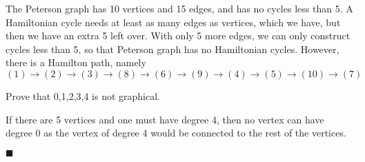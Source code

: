 \documentclass[12pt]{article}
\renewcommand{\qed}{\hfill$\blacksquare$}
\renewenvironment{proof}{\vspace{1em}\begin{addmargin}[2em]{0em}\begin{newproof}}{\end{newproof}\end{addmargin}\qed}
\newenvironment{exercise}[2][Exercise]{\begin{trivlist}
\item[\hskip \labelsep {\bfseries #1} \hskip \labelsep {\bfseries #2.}]}{\end{trivlist}}
\begin{document}
The Peterson graph has 10 vertices and 15 edges, and has no cycles less than 5. A Hamiltonian cycle needs at least as many edges as vertices, which we have, but then we have an extra 5 left over. With only 5 more edges, we can only construct cycles less than 5, so that Peterson graph has no Hamiltonian cycles. However, there is a Hamilton path, namely
\[
	(1) \to (2) \to (3) \to (8) \to (6) \to (9) \to (4) \to (5) \to (10) \to (7)
\]
\begin{exercise} {5.1.4 (1pt)}
	Prove that 0,1,2,3,4 is not graphical.
\end{exercise}
\begin{proof}
	If there are 5 vertices and one must have degree 4, then no vertex can have degree 0 as the vertex of degree 4 would be connected to the rest of the vertices.
\end{proof}
\end{document}
